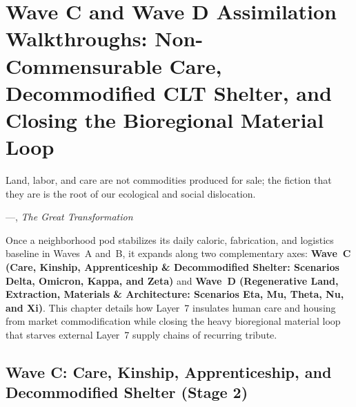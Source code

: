 \chapter{Wave C and Wave D Assimilation Walkthroughs: Non-Commensurable Care, Decommodified CLT Shelter, and Closing the Bioregional Material Loop}
\label{ch:l7-waves-c-and-d}

\epigraph{Land, labor, and care are not commodities produced for sale; the fiction that they are is the root of our ecological and social dislocation.}{---\textcite{polanyi1944great}, \textit{The Great Transformation}}

Once a neighborhood pod stabilizes its daily caloric, fabrication, and logistics baseline in Waves~A and~B, it expands along two complementary axes: \textbf{Wave~C (Care, Kinship, Apprenticeship \& Decommodified Shelter: Scenarios Delta, Omicron, Kappa, and Zeta)} and \textbf{Wave~D (Regenerative Land, Extraction, Materials \& Architecture: Scenarios Eta, Mu, Theta, Nu, and Xi)}. This chapter details how Layer~7 insulates human care and housing from market commodification while closing the heavy bioregional material loop that starves external Layer~7 supply chains of recurring tribute.

\section{Wave C: Care, Kinship, Apprenticeship, and Decommodified Shelter (Stage 2)}
\label{sec:l7-wave-c}

